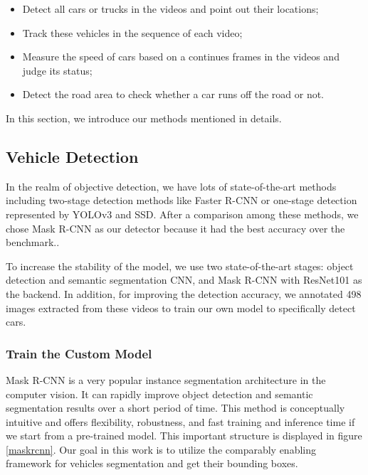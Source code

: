 \documentclass[10pt,twocolumn,letterpaper]{article}
\begin{document}
\begin{itemize}
	\item Detect all cars or trucks in the videos and point out their locations; 
	\item Track these vehicles in the sequence of each video; 
	\item Measure the speed of cars based on a continues frames in the videos and judge its status; 
	\item Detect the road area to check whether a car runs off the road or not. 
\end{itemize}

In this section, we introduce our methods mentioned in details.

\subsection{Vehicle Detection}

In the realm of objective detection, we have lots of state-of-the-art methods including two-stage detection methods like Faster R-CNN \cite{ren2015faster} or one-stage detection represented by YOLOv3\cite{redmon2018yolov3}
and SSD\cite{liu2016ssd}. After a comparison among these methods, we chose Mask R-CNN as our detector because it had the best accuracy over the benchmark.\cite{DBLP:journals/corr/HeGDG17}.

To increase the stability of the model, we use two state-of-the-art stages: object detection and semantic segmentation CNN, and Mask R-CNN \cite{DBLP:journals/corr/HeGDG17} with ResNet101 as the backend. In addition, for improving the detection accuracy, we annotated 498 images extracted from these videos to train our own model to specifically detect cars.
	
\subsubsection{Train the Custom Model}

Mask R-CNN is a very popular instance segmentation architecture in the computer vision. It can rapidly improve object detection and semantic segmentation results over a short period of time. This method is conceptually intuitive and offers flexibility, robustness, and fast training and inference time if we start from a pre-trained model. This important structure is displayed in figure \ref{maskrcnn}. Our goal in this work is to utilize the comparably enabling framework for vehicles segmentation and get their bounding boxes.
\end{document}
